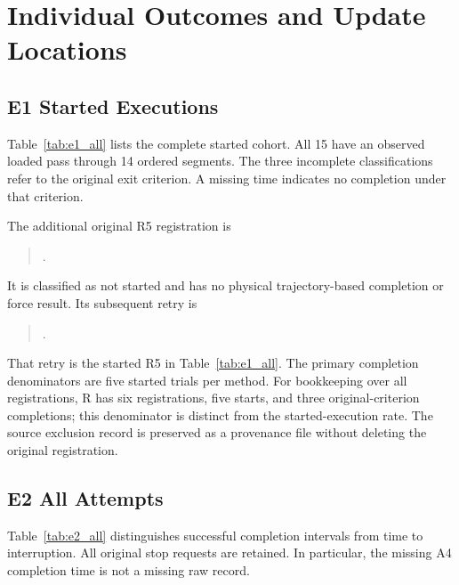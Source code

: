 \chapter{Individual Outcomes and Update Locations}
\label{app:runs}

\section{E1 Started Executions}
Table~\ref{tab:e1_all} lists the complete started cohort. All 15 have an observed loaded pass through 14 ordered segments. The three incomplete classifications refer to the original exit criterion. A missing time indicates no completion under that criterion.

\begin{table}[tbp]\centering\small
\caption[Individual E1 outcomes]{Individual E1 original-criterion outcomes. Every listed execution is retained. Full run identifiers and original directories are in the accompanying CSV inventory.}
\label{tab:e1_all}
\end{table}

The additional original R5 registration is
\begin{quote}\footnotesize{}.\end{quote}
It is classified as not started and has no physical trajectory-based completion or force result. Its subsequent retry is
\begin{quote}\footnotesize{}.\end{quote}
That retry is the started R5 in Table~\ref{tab:e1_all}. The primary completion denominators are five started trials per method. For bookkeeping over all registrations, R has six registrations, five starts, and three original-criterion completions; this denominator is distinct from the started-execution rate. The source exclusion record is preserved as a provenance file without deleting the original registration.

\section{E2 All Attempts}
Table~\ref{tab:e2_all} distinguishes successful completion intervals from time to interruption. All original stop requests are retained. In particular, the missing A4 completion time is not a missing raw record.

\begin{table}[tbp]\centering\small
\caption[Individual E2 corrected task outcomes]{Individual E2 task outcomes after the A4 field correction. ``Operator completed'' uses the recorded operator interpretation; it is not an automatic E1 evaluation.}
\label{tab:e2_all}
\end{table}

